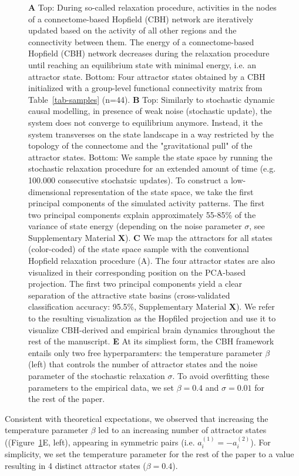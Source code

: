 \documentclass{article}
\begin{document}
\begin{figure}[!htbp]
{\textbf{A} Top: During so-called relaxation procedure, activities in the nodes of a connectome-based Hopfield (CBH) network are iteratively updated based on the activity of all other regions and the connectivity between them.
The energy of a connectome-based Hopfield (CBH) network decreases during the relaxation procedure until reaching an equilibrium state with minimal energy, i.e. an attractor state.
Bottom: Four attractor states obtained by a CBH initialized with a group-level functional connectivity matrix from Table~\ref{tab-samples} (n=44).
\textbf{B} Top: Similarly to stochastic dynamic causal modelling, in presence of weak noise (stochastic update), the system does not converge to equilibrium anymore. Instead, it the system transverses on the state landscape in a way restricted by the topology of the connectome and the "gravitational pull" of the attractor states.
Bottom: We sample the state space by running the stochastic relaxation procedure for an extended amount of time (e.g. 100.000 consecutive stochatsic updates). To construct a low-dimensional representation of the state space, we take the first principal components of the simulated activity patterns. The first two principal components explain approximately 55-85\% of the variance of state energy (depending on the noise parameter $\sigma$, see Supplementary Material \textbf{X}).
\textbf{C} We map the attractors for all states (color-coded) of the state space sample with the conventional Hopfield relaxation procedure (A). The four attractor states are also visualized in their corresponding position on the PCA-based projection. The first two principal components yield a clear separation of the attractive state basins (cross-validated classification accuracy: 95.5\%, Supplementary Material \textbf{X}). We refer to the resulting visualization as the Hopfiled projection and use it to visualize CBH-derived and empirical brain dynamics throughout the rest of the manuscript.
\textbf{E} At its simpliest form, the CBH framework entails only two free hyperparamters: the temperature parameter $\beta$ (left) that controls the number of attractor states and the noise parameter of the stochastic relaxation $\sigma$. To avoid overfitting these parameters to the empirical data, we set $\beta=0.4$ and $\sigma=0.01$ for the rest of the paper.}
\label{attractors}
\end{figure}

Consistent with theoretical expectations, we observed that increasing the temperature parameter $\beta$ led to an increasing number of attractor states ((Figure~\ref{attractors}E, left), appearing in symmetric pairs (i.e. $a_i^{(1)} = -a_i^{(2)}$).
For simplicity, we set the temperature parameter for the rest of the paper to a value resulting in 4 distinct attractor states ($\beta=0.4$).
\end{document}
